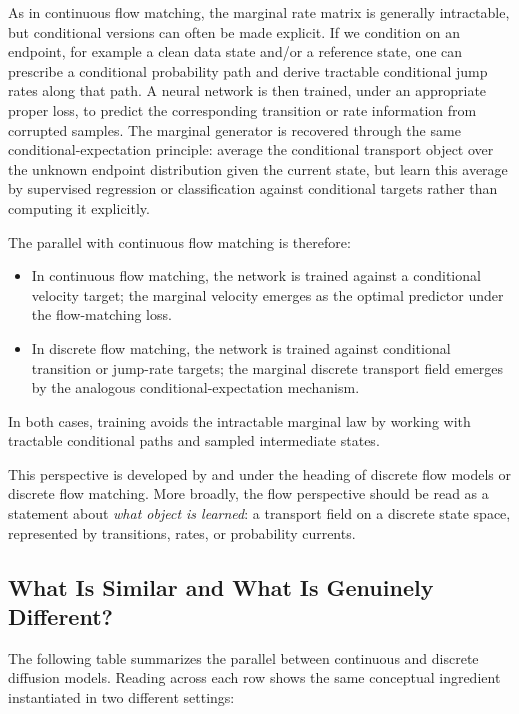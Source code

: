 As in continuous flow matching, the marginal rate matrix is generally
intractable, but conditional versions can often be made explicit.  If we
condition on an endpoint, for example a clean data state and/or a reference state, one can prescribe a conditional probability
path and derive tractable conditional jump rates along that path. A neural
network is then trained, under an appropriate proper loss, to predict the corresponding transition or rate information from corrupted
samples. The marginal generator is recovered through the same conditional-expectation principle: average the conditional transport object over the unknown endpoint distribution given the current state, but learn this average by supervised regression or classification against conditional targets rather than computing it explicitly.

The parallel with continuous flow matching is therefore:
\begin{itemize}[leftmargin=2em]
    \item In continuous flow matching, the network is trained against a
      conditional velocity target; the marginal velocity emerges as the
      optimal predictor under the flow-matching loss.
    \item In discrete flow matching, the network is trained against conditional
      transition or jump-rate targets; the marginal discrete transport field
      emerges by the analogous conditional-expectation mechanism.
\end{itemize}
In both cases, training avoids the intractable marginal law by working
with tractable conditional paths and sampled intermediate states.

This perspective is developed by \citet{campbell2024generative} and
\citet{gat2024discrete} under the heading of discrete flow models or discrete flow matching. More broadly, the flow perspective should be read as a statement about \emph{what object is learned}: a transport field on a discrete state space, represented by transitions, rates, or probability currents.

\subsection{What Is Similar and What Is Genuinely Different?}
\label{subsec:epilogue-genuine-diff}

The following table summarizes the parallel between continuous and
discrete diffusion models. Reading across each row shows the same
conceptual ingredient instantiated in two different settings:

